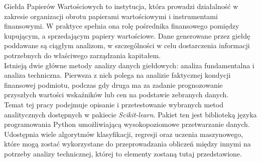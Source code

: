 \documentclass[man,mfi|min|mpt|mok|mub|mza|miz|bsp]{mgrwms}
\begin{document}
\begin{wstep}[Wprowadzenie]  %
Giełda Papierów Wartościowych to instytucja, która prowadzi działalność w zakresie organizacji obrotu papierami wartościowymi i instrumentami finansowymi\cite{gpw}.
W praktyce spełnia ona rolę pośrednika finansowego pomiędzy kupującym, a sprzedającym papiery wartościowe.
Dane generowane przez giełdę poddawane są ciągłym analizom, w szczególności w celu dostarczenia informacji potrzebnych do właściwego zarządzania kapitałem.\\

Istnieją dwie główne metody analizy danych giełdowych: analiza fundamentalna i analiza techniczna\cite{basics_of_tech_analysis}.
Pierwsza z nich polega na analizie faktycznej kondycji finansowej podmiotu, podczas gdy druga ma za zadanie prognozowanie przyszłych wartości wskaźników lub cen na podstawie zebranych danych.\\

Temat tej pracy podejmuje opisanie i przetestowanie wybranych metod analitycznych dostępnych w pakiecie \textit{Scikit-learn}.
Pakiet ten jest biblioteką języka programowania Python umożliwiającą wysokopoziomowe przetwarzanie danych.
Udostępnia wiele algorytmów klasyfikacji, regresji oraz uczenia maszynowego, które mogą zostać wykorzystane do przeprowadzania obliczeń między innymi na potrzeby analizy technicznej, której to elementy zostaną tutaj przedstawione.

\end{wstep}










%

%
\end{document}
